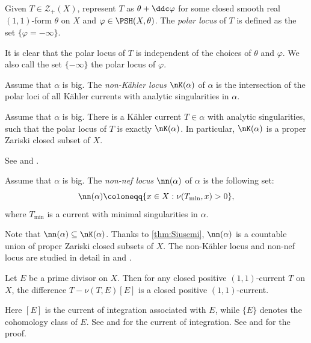 \begin{definition}\label{def:polarlocus}
    Given $T\in \mathcal{Z}_+(X)$, represent $T$ as $\theta+\ddc\varphi$ for some closed smooth real $(1,1)$-form $\theta$ on $X$ and $\varphi\in \PSH(X,\theta)$. The \emph{polar locus} of $T$ is defined as the set $\{\varphi=-\infty\}$.
\end{definition}
It is clear that the polar locus of $T$ is independent of the choices of $\theta$ and $\varphi$. We also call the set $\{-\infty\}$ the polar locus of $\varphi$.

\begin{definition}\label{def:nKlocus}
    Assume that $\alpha$ is big. The \emph{non-Kähler locus} $\nK(\alpha)$\index{$\nK(\alpha)$} of $\alpha$ is the intersection of the polar loci of all Kähler currents with analytic singularities in $\alpha$.
\end{definition}
\begin{theorem}[Boucksom]\label{thm:pshfunctions:L1641}
Assume that $\alpha$ is big.
    There is a Kähler current $T\in \alpha$ with analytic singularities, such that the polar locus of $T$ is exactly $\nK(\alpha)$. In particular, $\nK(\alpha)$ is a proper Zariski closed subset of $X$.
\end{theorem}
See \cite[Théorème~2.1.20]{Bou02} and \cite[Theorem~14.4.4]{FPT}.

\begin{definition}\label{def:nnlocus}
     Assume that $\alpha$ is big. The \emph{non-nef locus} $\nn(\alpha)$\index{$\nn(\alpha)$} of $\alpha$ is the following set:
     \[
     \nn(\alpha)\coloneqq \{x\in X :\nu(T_{\min},x)>0\},
     \]
     where $T_{\min}$ is a current with minimal singularities in $\alpha$.
\end{definition}
Note that $\nn(\alpha)\subseteq \nK(\alpha)$. Thanks to \cref{thm:Siusemi}, $\nn(\alpha)$ is a countable union of proper Zariski closed subsets of $X$. The non-Kähler locus and non-nef locus are studied in detail in \cite{Bou02} and \cite[Section~14.4]{FPT}.


\begin{lemma}\label{lma:Siudec}
    Let $E$ be a prime divisor on $X$. Then for any closed positive $(1,1)$-current $T$ on $X$, the difference $T-\nu(T,E)[E]$ is a closed positive $(1,1)$-current.
\end{lemma}
Here $[E]$ is the current of integration associated with $E$, while $\{E\}$ denotes the cohomology class of $E$. See \cite[Page~386, Example~1]{GH14} and \cite[Section~7.4]{FPT} for the current of integration. See \cite[Lemma~2.17]{Dem12} and \cite[Theorem~14.3.7]{FPT} for the proof.


